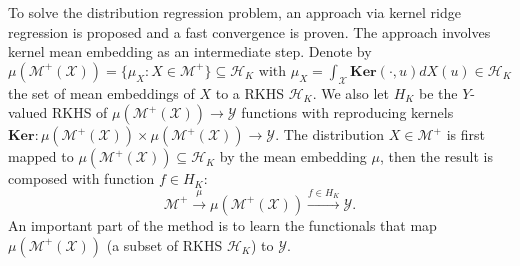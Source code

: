 \documentclass{article}
\def\NN{\mathbb N}
\def\RR{\mathbb R}
\numberwithin{equation}{section}
\newtheorem{definition}[theorem]{Definition}
\begin{document}
To solve the distribution regression problem, an approach via kernel ridge regression is proposed \citep{szabo2016learning} and a fast convergence is proven. 
The approach involves kernel mean embedding as an intermediate step. Denote by
$
    \mu(\mathcal{M}^+(\mathcal{X})) = \{\mu_X:X\in \mathcal{M}^+\} \subseteq \mathcal H_K \text{ with } \mu_X = \int_{\mathcal{X}} \textbf{Ker}(\cdot,u)dX(u) \in  \mathcal H_K
$
the set of mean embeddings of $X$ to a RKHS $\mathcal H_K$. %
We also let $H_K $ be the $Y$-valued RKHS of $\mu(\mathcal{M}^+(\mathcal{X})) \rightarrow \mathcal{Y}$ functions with reproducing kernels $\textbf{Ker}: \mu(\mathcal{M}^+(\mathcal{X})) \times \mu(\mathcal{M}^+(\mathcal{X})) \rightarrow \mathcal{Y}$. 
The distribution $X\in \mathcal{M}^+$ is first mapped to $\mu(\mathcal{M}^+(\mathcal{X})) \subseteq \mathcal H_K$ by the mean embedding $\mu$, then the result is composed with function $f\in H_K$:
\begin{equation*}
    \mathcal{M}^+ \overset{\mu} {\rightarrow} \mu(\mathcal{M}^+(\mathcal{X}))\overset{f\in H_K}{\longrightarrow} \mathcal{Y}. 
\end{equation*}
An important part of the method is to learn the functionals that map $\mu(\mathcal{M}^+(\mathcal{X}))$ (a subset of RKHS $\mathcal H_K$)  to $\mathcal{Y}$. 
\end{document}
